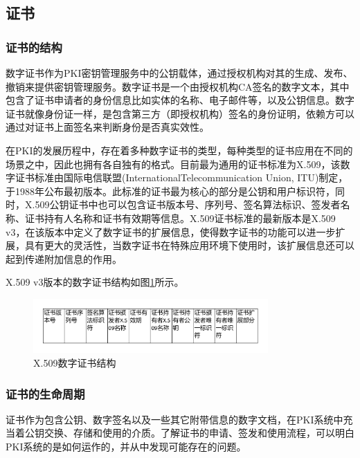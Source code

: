 \subsection{证书}

\subsubsection{证书的结构}

数字证书作为PKI密钥管理服务中的公钥载体，通过授权机构对其的生成、发布、撤销来提供密钥管理服务。数字证书是一个由授权机构CA签名的数字文本，其中包含了证书申请者的身份信息比如实体的名称、电子邮件等，以及公钥信息。数字证书就像身份证一样，是包含第三方（即授权机构）签名的身份证明，依赖方可以通过对证书上面签名来判断身份是否真实效性。

在PKI的发展历程中，存在着多种数字证书的类型，每种类型的证书应用在不同的场景之中，因此也拥有各自独有的格式。目前最为通用的证书标准为X.509，该数字证书标准由国际电信联盟(InternationalTelecommunication Union, ITU)制定，于1988年公布最初版本。此标准的证书最为核心的部分是公钥和用户标识符，同时，X.509公钥证书中也可以包含证书版本号、序列号、签名算法标识、签发者名称、证书持有人名称和证书有效期等信息。X.509证书标准的最新版本是X.509 v3，在该版本中定义了数字证书的扩展信息，使得数字证书的功能可以进一步扩展，具有更大的灵活性，当数字证书在特殊应用环境下使用时，该扩展信息还可以起到传递附加信息的作用。

X.509 v3版本的数字证书结构如图\ref{fig:cert}所示。

\begin{figure}[htbp]
 	\centering
 	\includegraphics[width = 0.8\textwidth]{img/cert}
 	\caption{X.509数字证书结构}\label{fig:cert}
\end{figure}




\subsubsection{证书的生命周期}


证书作为包含公钥、数字签名以及一些其它附带信息的数字文档，在PKI系统中充当着公钥交换、存储和使用的介质。了解证书的申请、签发和使用流程，可以明白PKI系统的是如何运作的，并从中发现可能存在的问题。

